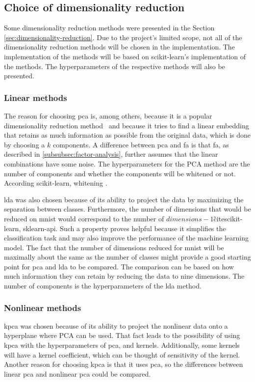 \subsection{Choice of dimensionality reduction}\label{sec:choice-of-dimensionality-reduction}
Some dimensionality reduction methods were presented in the Section \ref{sec:dimensionality-reduction}. Due to the project's limited scope, not all of the dimensionality reduction methods will be chosen in the implementation. The implementation of the methods will be based on scikit-learn's implementation of the methods. The hyperparameters of the respective methods will also be presented.



\subsubsection{Linear methods}
The reason for choosing \gls{pca} is, among others, because it is a popular dimensionality reduction method~\cite{dimensionality-reduction-comparative-review} and because it tries to find a linear embedding that retains as much information as possible from the original data, which is done by choosing a $k$ components. A difference between \gls{pca} and \gls{fa} is that \gls{fa}, as described in \ref{subsubsec:factor-analysis}, further assumes that the linear combinations have some noise. The hyperparameters for the PCA method are the number of components and whether the components will be whitened or not. According scikit-learn, whitening .


\gls{lda} was also chosen because of its ability to project the data by maximizing the separation between classes. Furthermore, the number of dimensions that would be reduced on \gls{mnist} would correspond to the number of $dimensions-1$\~cite{scikit-learn, sklearn-api}. Such a property proves helpful because it simplifies the classification task and may also improve the performance of the machine learning model. The fact that the number of dimensions reduced for \gls{mnist} will be maximally about the same as the number of classes might provide a good starting point for \gls{pca} and \gls{lda} to be compared. The comparison can be based on how much information they can retain by reducing the data to nine dimensions. The number of components is the hyperparameters of the \gls{lda} method.


\subsubsection{Nonlinear methods}
\gls{kpca} was chosen because of its ability to project the nonlinear data onto a hyperplane where PCA can be used. That fact leads to the possibility of using \gls{kpca} with the hyperparameters of \gls{pca}, and kernels. Additionally, some kernels will have a kernel coefficient, which can be thought of sensitivity of the kernel. Another reason for choosing \gls{kpca} is that it uses \gls{pca}, so the differences between linear \gls{pca} and nonlinear \gls{pca} could be compared.

